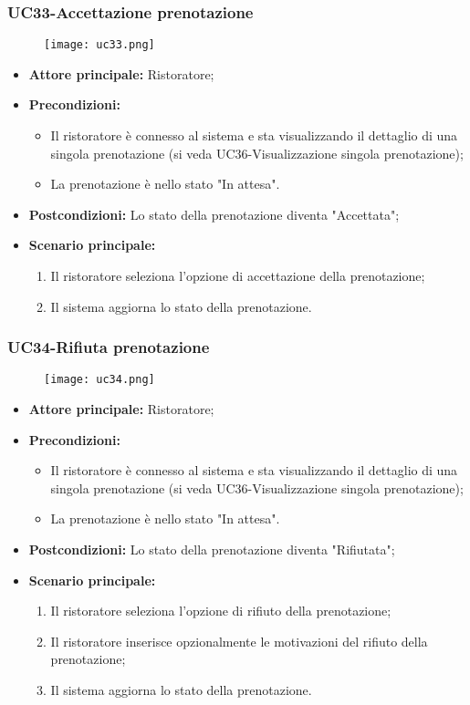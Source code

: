 \subsubsection{UC33-Accettazione prenotazione}
\begin{figure}[h] \texttt{[image: uc33.png]} \end{figure}
\begin{itemize}
\item \textbf{Attore principale:} Ristoratore;
\item \textbf{Precondizioni:}
\begin{itemize}
        \item Il ristoratore è connesso al sistema e sta visualizzando il dettaglio di una singola prenotazione (si veda UC36-Visualizzazione singola prenotazione);
        \item La prenotazione è nello stato "In attesa".
\end{itemize}
\item \textbf{Postcondizioni:} Lo stato della prenotazione diventa "Accettata";
\item \textbf{Scenario principale:}
\begin{enumerate}
    \item Il ristoratore seleziona l'opzione di accettazione della prenotazione;
    \item Il sistema aggiorna lo stato della prenotazione.
\end{enumerate}
\end{itemize}

\pagebreak
\subsubsection{UC34-Rifiuta prenotazione}
\begin{figure}[h] \texttt{[image: uc34.png]} \end{figure}
\begin{itemize}
\item \textbf{Attore principale:} Ristoratore;
\item \textbf{Precondizioni:}
\begin{itemize}
        \item Il ristoratore è connesso al sistema e sta visualizzando il dettaglio di una singola prenotazione (si veda UC36-Visualizzazione singola prenotazione);
        \item La prenotazione è nello stato "In attesa".
\end{itemize}
\item \textbf{Postcondizioni:} Lo stato della prenotazione diventa "Rifiutata";
\item \textbf{Scenario principale:}
\begin{enumerate}
    \item Il ristoratore seleziona l'opzione di rifiuto della prenotazione;
    \item Il ristoratore inserisce opzionalmente le motivazioni del rifiuto della prenotazione;
    \item Il sistema aggiorna lo stato della prenotazione.
\end{enumerate}
\end{itemize}

